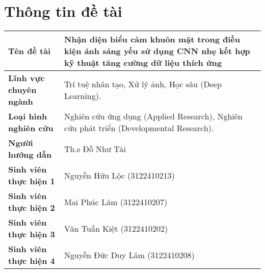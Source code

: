 \section*{Thông tin đề tài}
\begin{longtable}{|p{4.5cm}|p{11cm}|}
\hline
\textbf{Tên đề tài} & Nhận diện biểu cảm khuôn mặt trong điều kiện ánh sáng yếu sử dụng CNN nhẹ kết hợp kỹ thuật tăng cường dữ liệu thích ứng \\ \hline
\textbf{Lĩnh vực chuyên ngành} & Trí tuệ nhân tạo, Xử lý ảnh, Học sâu (Deep Learning). \\ \hline
\textbf{Loại hình nghiên cứu} &  Nghiên cứu ứng dụng (Applied Research), Nghiên cứu phát triển (Developmental Research). \\ \hline
\textbf{Người hướng dẫn} & Th.s Đỗ Như Tài \\ \hline
\textbf{Sinh viên thực hiện 1} & Nguyễn Hữu Lộc (3122410213) \\ \hline
\textbf{Sinh viên thực hiện 2} & Mai Phúc Lâm (3122410207)\\ \hline
\textbf{Sinh viên thực hiện 3} & Văn Tuấn Kiệt (3122410202)\\ \hline
\textbf{Sinh viên thực hiện 4} & Nguyễn Đức Duy Lâm (3122410208)\\ \hline
\end{longtable}